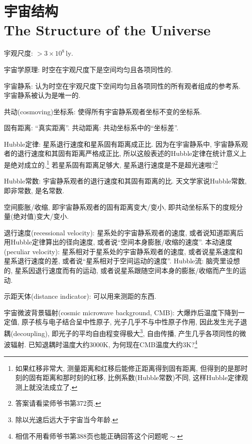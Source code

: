 \chapter{宇宙结构\\The Structure of the Universe}

宇观尺度: $>3\times10^{8}\,\text{ly}$.

宇宙学原理: 时空在宇观尺度下是空间均匀且各项同性的.

宇宙静系: 认为时空在宇观尺度下空间均匀且各项同性的所有观者组成的参考系. 宇宙静系被认为是唯一的.

共动(cosmoving)坐标系: 使得所有宇宙静系观者坐标不变的坐标系.

固有距离: ``真实距离''. 共动距离: 共动坐标系中的``坐标差''.

Hubble定律: 星系退行速度和星系固有距离成正比. 因为在宇宙静系中, 宇宙静系观者的退行速度和其固有距离严格成正比, 所以这般表述的Hubble定律在统计意义上是绝对成立的.\footnote{如果红移非常大, 测量距离和红移后能修正距离得到固有距离, 但得到的是那时刻的固有距离和那时刻的红移, 比例系数(Hubble常数)不同, 这样Hubble定律观测上就没法成立了.} 若星系固有距离足够大, 星系退行速度是不是超光速啦?\footnote{答案请看梁师爷书第372页.}

Hubble常数: 宇宙静系观者的退行速度和其固有距离的比. 天文学家说Hubble常数, 即非常数, 是名常数.

空间膨胀/收缩, 即宇宙静系观者的固有距离变大/变小, 即共动坐标系下的度规分量(绝对值)变大/变小.

退行速度(recessional velocity): 星系处的宇宙静系观者的速度, 或者说知道距离后用Hubble定律算出的径向速度, 或者说``空间本身膨胀/收缩的速度''. 本动速度(peculiar velocity): 星系相对于星系处的宇宙静系观者的速度, 或者说星系速度和星系退行速度的差, 或者说``星系相对于空间运动的速度''. Hubble流: 脑壳里设想的, 星系因退行速度而有的运动, 或者说星系跟随空间本身的膨胀/收缩而产生的运动.

示距天体(distance indicator): 可以用来测距的东西.

宇宙微波背景辐射(cosmic microwave background, CMB): 大爆炸后温度下降到一定值, 原子核与电子结合呈中性原子, 光子几乎不与中性原子作用, 因此发生光子退耦(decoupling), 即光子的平均自由程变得极大\footnote{除以光速后远大于宇宙当今年龄.}, 自由传播, 产生几乎各项同性的微波辐射. 已知退耦时温度大约$3000\text{K}$, 为何现在CMB温度大约$3\text{K}$?\footnote{相信不用看师爷书第388页也能正确回答这个问题呢$\!\sim$}
